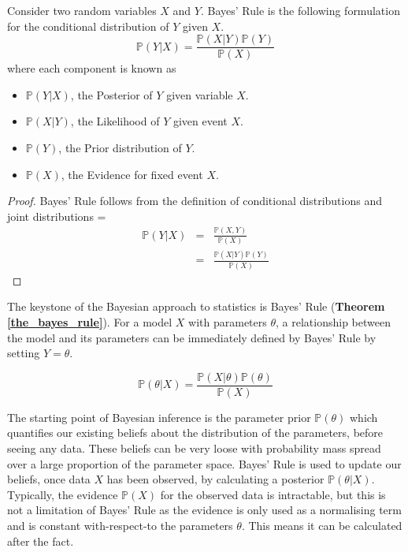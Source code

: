 \documentclass[11pt,a4paper]{article}
\newcommand*{\prob}{\mathbb{P}}
\theoremstyle{break}
\begin{document}
  \begin{box_theorem}\label{the_bayes_rule}
    Consider two random variables $X$ and $Y$. Bayes' Rule is the following formulation for the conditional distribution of $Y$ given $X$.
    \[ \prob(Y|X)=\frac{\prob(X|Y)\prob(Y)}{\prob(X)} \]
    where each component is known as
    \begin{itemize}
      \item $\prob(Y|X)$, the Posterior of $Y$ given variable $X$.
      \item $\prob(X|Y)$, the Likelihood of $Y$ given event $X$.
      \item $\prob(Y)$, the Prior distribution of $Y$.
      \item $\prob(X)$, the Evidence for fixed event $X$.
    \end{itemize}
    \begin{proof}
      Bayes' Rule follows from the definition of conditional distributions and joint distributions
      \everymath={\displaystyle}
      \[\begin{array}{rcl}
        \prob(Y|X)&=&\frac{\prob(X,Y)}{\prob(X)}\\
        &=&\frac{\prob(X|Y)\prob(Y)}{\prob(X)}
      \end{array}\]
    \end{proof}
  \end{box_theorem}

  \par The keystone of the Bayesian approach to statistics is Bayes' Rule (\textbf{Theorem \ref{the_bayes_rule}}). For a model $X$ with parameters $\theta$, a relationship between the model and its parameters can be immediately defined by Bayes' Rule by setting $Y=\theta$.

  \[ \prob(\theta|X)=\frac{\prob(X|\theta)\prob(\theta)}{\prob(X)} \]

  \par The starting point of Bayesian inference is the parameter prior $\prob(\theta)$ which quantifies our existing beliefs about the distribution of the parameters, before seeing any data. These beliefs can be very loose with probability mass spread over a large proportion of the parameter space. Bayes' Rule is used to update our beliefs, once data $X$ has been observed, by calculating a posterior $\prob(\theta|X)$. Typically, the evidence $\prob(X)$ for the observed data is intractable, but this is not a limitation of Bayes' Rule as the evidence is only used as a normalising term and is constant with-respect-to the parameters $\theta$. This means it can be calculated after the fact.
\end{document}
